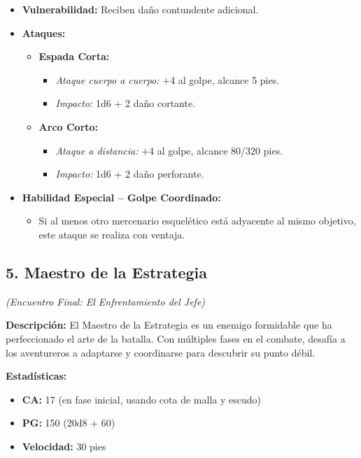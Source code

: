 \documentclass[
  twocolumn]{article}
\providecommand{\tightlist}{%
  \setlength{\itemsep}{0pt}\setlength{\parskip}{0pt}}
\begin{document}
\begin{itemize}
\tightlist
\item
  \textbf{Vulnerabilidad:} Reciben daño contundente adicional.
\item
  \textbf{Ataques:}

  \begin{itemize}
  \tightlist
  \item
    \textbf{Espada Corta:}

    \begin{itemize}
    \tightlist
    \item
      \emph{Ataque cuerpo a cuerpo:} +4 al golpe, alcance 5 pies.
    \item
      \emph{Impacto:} 1d6 + 2 daño cortante.
    \end{itemize}
  \item
    \textbf{Arco Corto:}

    \begin{itemize}
    \tightlist
    \item
      \emph{Ataque a distancia:} +4 al golpe, alcance 80/320 pies.
    \item
      \emph{Impacto:} 1d6 + 2 daño perforante.
    \end{itemize}
  \end{itemize}
\item
  \textbf{Habilidad Especial -- Golpe Coordinado:}

  \begin{itemize}
  \tightlist
  \item
    Si al menos otro mercenario esquelético está adyacente al mismo
    objetivo, este ataque se realiza con ventaja.
  \end{itemize}
\end{itemize}

\subsection{5. Maestro de la Estrategia}\label{maestro-de-la-estrategia}

\emph{(Encuentro Final: El Enfrentamiento del Jefe)}

\textbf{Descripción:} El Maestro de la Estrategia es un enemigo
formidable que ha perfeccionado el arte de la batalla. Con múltiples
fases en el combate, desafía a los aventureros a adaptarse y coordinarse
para descubrir su punto débil.

\textbf{Estadísticas:}

\begin{itemize}
\tightlist
\item
  \textbf{CA:} 17 (en fase inicial, usando cota de malla y escudo)
\item
  \textbf{PG:} 150 (20d8 + 60)
\item
  \textbf{Velocidad:} 30 pies
\end{itemize}
\end{document}
